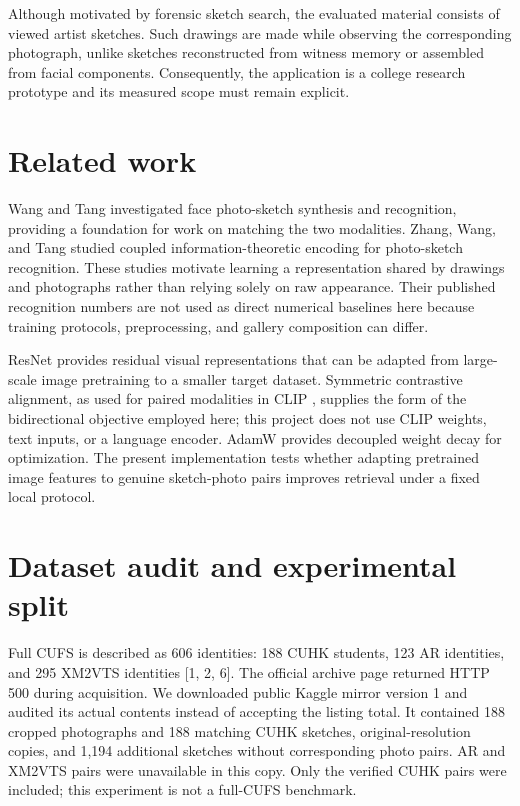 \documentclass[cameraready]{ieeeconf}
\begin{document}
Although motivated by forensic sketch search, the evaluated material consists of viewed artist sketches. Such drawings are made while observing the corresponding photograph, unlike sketches reconstructed from witness memory or assembled from facial components. Consequently, the application is a college research prototype and its measured scope must remain explicit.


\section{Related work}

Wang and Tang \cite{ref1} investigated face photo-sketch synthesis and recognition, providing a foundation for work on matching the two modalities. Zhang, Wang, and Tang \cite{ref2} studied coupled information-theoretic encoding for photo-sketch recognition. These studies motivate learning a representation shared by drawings and photographs rather than relying solely on raw appearance. Their published recognition numbers are not used as direct numerical baselines here because training protocols, preprocessing, and gallery composition can differ.


ResNet \cite{ref3} provides residual visual representations that can be adapted from large-scale image pretraining to a smaller target dataset. Symmetric contrastive alignment, as used for paired modalities in CLIP \cite{ref4}, supplies the form of the bidirectional objective employed here; this project does not use CLIP weights, text inputs, or a language encoder. AdamW \cite{ref5} provides decoupled weight decay for optimization. The present implementation tests whether adapting pretrained image features to genuine sketch-photo pairs improves retrieval under a fixed local protocol.


\section{Dataset audit and experimental split}

Full CUFS is described as 606 identities: 188 CUHK students, 123 AR identities, and 295 XM2VTS identities [1, 2, 6]. The official archive page returned HTTP 500 during acquisition. We downloaded public Kaggle mirror version 1 \cite{ref6} and audited its actual contents instead of accepting the listing total. It contained 188 cropped photographs and 188 matching CUHK sketches, original-resolution copies, and 1,194 additional sketches without corresponding photo pairs. AR and XM2VTS pairs were unavailable in this copy. Only the verified CUHK pairs were included; this experiment is not a full-CUFS benchmark.
\end{document}
